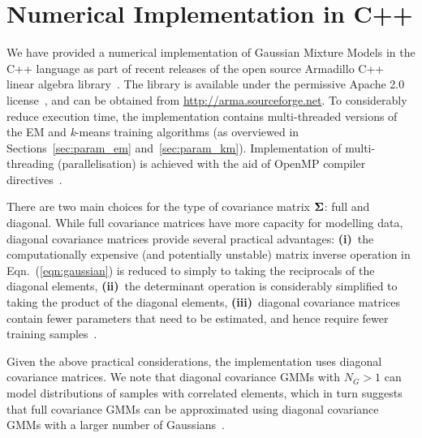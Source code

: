 \section{Numerical Implementation in C++}
\label{sec:implementation}

We have provided a numerical implementation of Gaussian Mixture Models in the C++ language
as part of recent releases of the open source Armadillo C++ linear algebra library~\cite{Armadillo_JOSS_2016,Armadillo_PASC_2017}.
The library is available under the permissive Apache 2.0 license~\cite{Laurent_2008},
and can be obtained from \href{http://arma.sourceforge.net}{http://arma.sourceforge.net}.
To considerably reduce execution time,
the implementation contains multi-threaded versions of the EM and {\it k}-means training algorithms
(as overviewed in Sections~\ref{sec:param_em} and~\ref{sec:param_km}).
Implementation of multi-threading (parallelisation) is achieved with the aid of OpenMP compiler directives~\cite{OpenMP_2007}.


There are two main choices for the type of covariance matrix ${\boldsymbol{\Sigma}}$: full and diagonal.
While full covariance matrices have more capacity for modelling data,
diagonal covariance matrices provide several practical advantages:
{\bf (i)}~the computationally expensive (and potentially unstable) matrix inverse operation in Eqn.~(\ref{eqn:gaussian})
is reduced to simply to taking the reciprocals of the diagonal elements,
{\bf (ii)}~the determinant operation is considerably simplified to taking the product of the diagonal elements,
{\bf (iii)}~diagonal covariance matrices contain fewer parameters that need to be estimated, and hence require fewer training samples~\cite{Duda01}.

Given the above practical considerations, the implementation uses diagonal covariance matrices.
We note that diagonal covariance GMMs with $N_G > 1$ can model distributions of samples with correlated elements,
which in turn suggests that full covariance GMMs can be approximated using diagonal covariance GMMs with a larger number of Gaussians~\cite{Reynolds_2000}.

